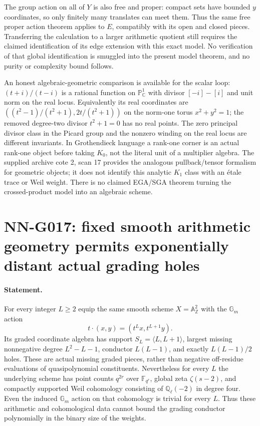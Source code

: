 The group action on all of $Y$ is also free and proper: compact
sets have bounded $y$ coordinates, so only finitely many translates
can meet them. Thus the same free proper action theorem applies
to $E$, compatibly with its open and closed pieces. Transferring
the calculation to a larger arithmetic quotient still requires the
claimed identification of its edge extension with this exact model.
No verification of that global identification is smuggled into
the present model theorem, and no purity or complexity bound follows.

An honest algebraic-geometric comparison is available for the
scalar loop: $(t+i)/(t-i)$ is a rational function on
$\mathbb P^1_{\mathbb C}$ with divisor $[-i]-[i]$ and unit norm
on the real locus. Equivalently its real coordinates are
$((t^2-1)/(t^2+1),2t/(t^2+1))$ on the norm-one torus
$x^2+y^2=1$; the removed degree-two divisor $t^2+1=0$ has no
real points. The zero principal divisor class in the Picard
group and the nonzero winding on the real locus are different
invariants. In Grothendieck language a rank-one corner is an
actual rank-one object before taking $K_0$, not the literal unit
of a multiplier algebra. The supplied archive cote 2, scan 17
provides the analogous pullback/tensor formalism for geometric
objects; it does not identify this analytic $K_1$ class with an
\'{e}tale trace or Weil weight. There is no claimed EGA/SGA theorem
turning the crossed-product model into an algebraic scheme.



\section{NN-G017: fixed smooth arithmetic geometry permits exponentially distant actual grading holes}
\paragraph{Statement.}
For every integer $L\ge2$ equip the same smooth scheme
$X=\mathbb A^2_{\mathbb Z}$ with the $\mathbb G_m$ action
\[
t\cdot(x,y)=(t^Lx,t^{L+1}y).
\]
Its graded coordinate algebra has support
$S_L=\langle L,L+1\rangle$, largest missing nonnegative degree
$L^2-L-1$, conductor $L(L-1)$, and exactly $L(L-1)/2$ holes.
These are actual missing graded pieces, rather than negative
off-residue evaluations of quasipolynomial constituents.
Nevertheless for every $L$ the underlying scheme has point counts
$q^{2r}$ over $\mathbb F_{q^r}$, global zeta $\zeta(s-2)$,
and compactly supported Weil cohomology consisting of
$\mathbb Q_\ell(-2)$ in degree four. Even the induced
$\mathbb G_m$ action on that cohomology is trivial for every $L$.
Thus these arithmetic and cohomological data cannot bound the
grading conductor polynomially in the binary size of the weights.

